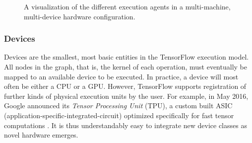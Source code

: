 \begin{figure}
  \caption{A visualization of the different execution agents in a multi-machine,
    multi-device hardware configuration.}
  \label{fig:exec}
\end{figure}

\subsubsection{Devices}\label{sec:model-exec-devices}

Devices are the smallest, most basic entities in the TensorFlow execution
model. All nodes in the graph, that is, the kernel of each operation, must
eventually be mapped to an available device to be executed. In practice, a
device will most often be either a CPU or a GPU. However, TensorFlow supports
registration of further kinds of physical execution units by the user. For
example, in May 2016, Google announced its \emph{Tensor Processing Unit} (TPU),
a custom built ASIC (application-specific-integrated-circuit) optimized
specifically for fast tensor computations \cite{tpu}. It is thus understandably
easy to integrate new device classes as novel hardware emerges.

